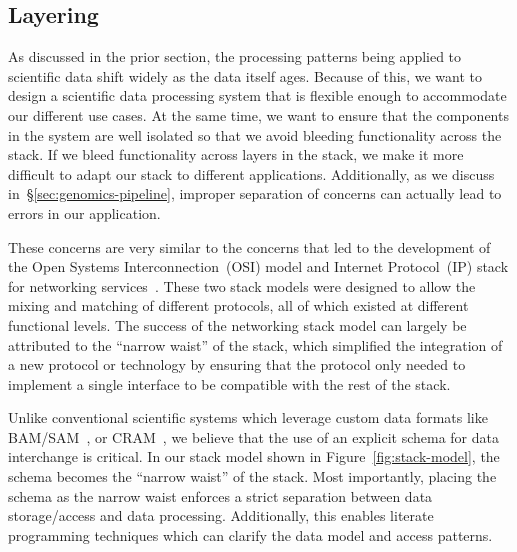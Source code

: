 \documentclass{acm_proc_article-sp}
\begin{document}
\subsection{Layering}
\label{sec:layering}

As discussed in the prior section, the processing patterns being applied to scientific data shift widely
as the data itself ages. Because of this, we want to design a scientific data processing system that is
flexible enough to accommodate our different use cases. At the same time, we want to ensure that the
components in the system are well isolated so that we avoid bleeding functionality across the stack. If
we bleed functionality across layers in the stack, we make it more difficult to adapt our stack to different
applications. Additionally, as we discuss in~\S\ref{sec:genomics-pipeline}, improper separation of concerns
can actually lead to errors in our application.

These concerns are very similar to the concerns that led to the development of the Open Systems
Interconnection~(OSI) model and Internet Protocol~(IP) stack for networking
services~\cite{zimmermann80}. These two stack models were designed to allow the mixing and matching
of different protocols, all of which existed at different functional levels. The success of the networking
stack model can largely be attributed to the ``narrow waist'' of the stack, which simplified the integration of
a new protocol or technology by ensuring that the protocol only needed to implement a single interface to
be compatible with the rest of the stack.

Unlike conventional scientific systems which leverage custom data formats like BAM/SAM~\cite{li09},
or CRAM~\cite{fritz11}, we believe that the use of an explicit schema for data interchange is critical.
In our stack model shown in Figure~\ref{fig:stack-model}, the schema becomes the ``narrow waist''
of the stack. Most importantly, placing the schema as the narrow waist enforces a strict separation between
data storage/access and data processing. Additionally, this enables literate programming techniques which
can clarify the data model and access patterns.
\end{document}
